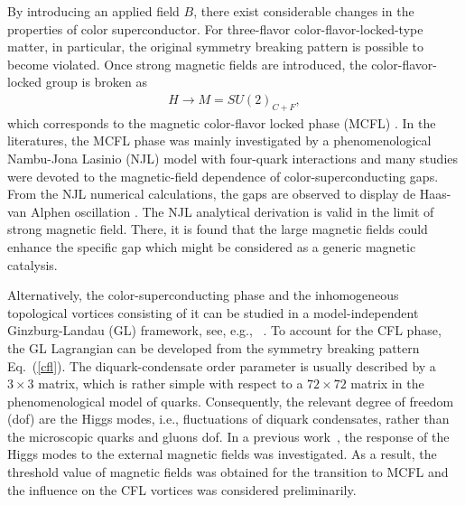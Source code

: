 By introducing an applied field $B$, there exist considerable changes in the properties of color
superconductor. For three-flavor color-flavor-locked-type matter, in particular, the original symmetry
breaking pattern is possible to become violated. Once strong magnetic fields are introduced, the
color-flavor-locked group is broken as
\begin{eqnarray}
H\rightarrow M=SU(2)_{C+F},\label{cfl2}\end{eqnarray}
which corresponds to the magnetic color-flavor locked phase
(MCFL) \cite{ferrer2005magnetic,fukushima2008color,ferrer2006color,ferrer2007magnetic}.
In the literatures, the MCFL phase was mainly investigated by a phenomenological Nambu-Jona Lasinio (NJL)
model with four-quark interactions and many studies were devoted to the magnetic-field dependence of
color-superconducting gaps.
From the NJL numerical calculations, the gaps are observed to display de Haas-van Alphen
oscillation \cite{ferrer2005magnetic,fukushima2008color}.
The NJL analytical derivation is valid in the limit of strong magnetic field. There, it is found that
the large magnetic fields could enhance the specific gap \cite{ferrer2006color,sen2015anisotropic} which
might be considered as a generic magnetic catalysis.

Alternatively, the color-superconducting phase and the inhomogeneous topological vortices consisting of it can be studied in a model-independent Ginzburg-Landau (GL) framework, see, e.g., ~\cite{giannakis2002ginzburg,iida2002superfluid,balachandran2006semisuperfluid,nakano2008non,eto2014vortices}.
To account for the CFL phase, the GL Lagrangian can be developed from the symmetry breaking pattern Eq.~(\ref{cfl}).
The diquark-condensate order parameter is usually described by a $3\times3$ matrix, which is rather simple with
respect to a $72 \times 72$ matrix in the phenomenological model of quarks. Consequently, the relevant degree
of freedom (dof) are the Higgs modes, i.e., fluctuations of diquark condensates, rather than the microscopic
quarks and gluons dof. In a previous work~\cite{zhang2015magnetic}, the response of the Higgs modes to the
external magnetic fields was investigated. As a result, the threshold value of magnetic fields was obtained
for the transition to MCFL and the influence on the CFL vortices was considered preliminarily.

